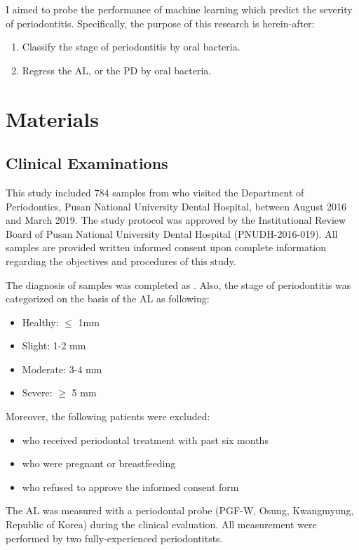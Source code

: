 \documentclass[11pt, a4paper]{article}
\begin{document}
			I aimed to probe the performance of machine learning which predict the severity of periodontitis. Specifically, the purpose of this research is herein-after:
    		\begin{enumerate}
				\item Classify the stage of periodontitis by oral bacteria.
				\item Regress the AL, or the PD by oral bacteria. 
    		\end{enumerate}
    
    \section{Materials}
    	\subsection{Clinical Examinations}
	    	This study included 784 samples from who visited the Department of Periodontics, Pusan National University Dental Hospital, between August 2016 and March 2019. The study protocol was approved by the Institutional Review Board of Pusan National University Dental Hospital (PNUDH-2016-019). All samples are provided written informed consent upon complete information regarding the objectives and procedures of this study.
	    	
	    	The diagnosis of samples was completed as \cite{ref:diagnosis1}. Also, the stage of periodontitis was categorized on the basis of the AL as following:
	    	\begin{itemize}
	    		\item Healthy: $\leq$ 1mm
				\item Slight: 1-2 mm
				\item Moderate: 3-4 mm
				\item Severe: $\geq$ 5 mm
	    	\end{itemize}
	    
	    	Moreover, the following patients were excluded:
	    	\begin{itemize}
				\item who received periodontal treatment with past six months
				\item who were pregnant or breastfeeding
				\item who refused to approve the informed consent form
	    	\end{itemize}
	    
	    	The AL was measured with a periodontal probe (PGF-W, Osung, Kwangmyung, Republic of Korea) during the clinical evaluation. All measurement were performed by two fully-experienced periodontitsts.
	    
\end{document}
